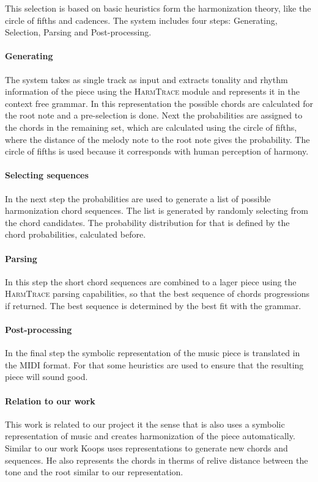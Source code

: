 This selection is based on basic heuristics form the harmonization theory, like the circle of fifths and cadences. The system includes four steps: Generating, Selection, Parsing and Post-processing. 

\paragraph{Generating} 
The system takes as single track as input and extracts tonality and rhythm information of the piece using the \textsc{HarmTrace} module and represents it in the context free grammar. In this representation the possible chords are calculated for the root note and a pre-selection is done. Next the probabilities are assigned to the chords in the remaining set, which are calculated using the circle of fifths, where the distance of the melody note to the root note gives the probability. The circle of fifths is used because it corresponds with human perception of harmony. 

\paragraph{Selecting sequences}
In the next step the probabilities are used to generate a list of possible harmonization chord sequences. The list is generated by randomly selecting from the chord candidates. The probability distribution for that is defined by the chord probabilities, calculated before. 

\paragraph{Parsing}
In this step the short chord sequences are combined to a lager piece using the \textsc{HarmTrace} parsing capabilities, so that the best sequence of chords progressions if returned. The best sequence is determined by the best fit with the grammar.

\paragraph{Post-processing}
In the final step the symbolic representation of the music piece is translated in the MIDI format. For that some heuristics are used to ensure that the resulting piece will sound good. 

\paragraph{Relation to our work}
This work is related to our project it the sense that is also uses a symbolic representation of music and creates harmonization of the piece automatically. Similar to our work Koops uses representations to generate new chords and sequences. He also represents the chords in therms of relive distance between the tone and the root similar to our representation.

